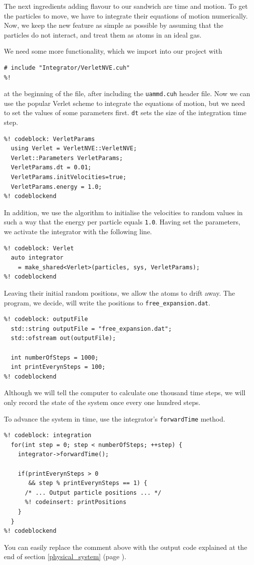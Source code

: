 The next ingredients adding flavour to our sandwich are time and motion. To get
the particles to move, we have to integrate their equations of motion
numerically. Now, we keep the new feature as simple as possible by assuming that
the particles do not interact, and treat them as atoms in an ideal gas.

We need some more functionality, which we import into our project with
\begin{lstlisting}
# include "Integrator/VerletNVE.cuh"
%!
\end{lstlisting}
at the beginning of the file, after including the \texttt{uammd.cuh} header
file. Now we can use the popular Verlet scheme to integrate the equations of
motion, but we need to set the values of some parameters first. \texttt{dt} sets
the size of the integration time step.
\begin{lstlisting}
%! codeblock: VerletParams
  using Verlet = VerletNVE::VerletNVE;
  Verlet::Parameters VerletParams;
  VerletParams.dt = 0.01;
  VerletParams.initVelocities=true;
  VerletParams.energy = 1.0;
%! codeblockend
\end{lstlisting}
In addition, we use the algorithm to initialise the velocities to random values
in such a way that the energy per particle equals \texttt{1.0}. Having set the
parameters, we activate the integrator with the following line.
\begin{lstlisting}
%! codeblock: Verlet
  auto integrator
    = make_shared<Verlet>(particles, sys, VerletParams);
%! codeblockend
\end{lstlisting}

Leaving their initial random positions, we allow the atoms to drift away. The 
program, we decide, will write the positions to \texttt{free\_expansion.dat}.
\begin{lstlisting}
%! codeblock: outputFile
  std::string outputFile = "free_expansion.dat";
  std::ofstream out(outputFile);

  int numberOfSteps = 1000;
  int printEverynSteps = 100;
%! codeblockend
\end{lstlisting}
Although we will tell the computer to calculate one thousand time steps, we
will only record the state of the system once every one hundred steps. 

To advance the system in time, use the integrator's \texttt{forwardTime} method.
\begin{lstlisting}
%! codeblock: integration
  for(int step = 0; step < numberOfSteps; ++step) {
    integrator->forwardTime();

    if(printEverynSteps > 0
       && step % printEverynSteps == 1) {
      /* ... Output particle positions ... */
      %! codeinsert: printPositions
    }
  }
%! codeblockend
\end{lstlisting}
You can easily replace the comment above with the output code explained at the
end of section \ref{physical_system} (page \pageref{particlePositions}).

